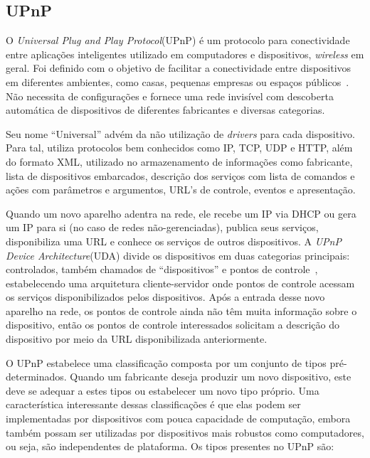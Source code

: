 \subsection{UPnP}
O \emph{Universal Plug and Play Protocol}(UPnP) é um protocolo para conectividade entre aplicações inteligentes utilizado em computadores e dispositivos, \emph{wireless} em geral. Foi definido com o objetivo de facilitar a conectividade entre dispositivos em diferentes ambientes, como casas, pequenas empresas ou espaços públicos~\cite{upnpArch}. Não necessita de configurações e fornece uma rede invisível com descoberta automática de dispositivos de diferentes fabricantes e diversas categorias.

Seu nome ``Universal'' advém da não utilização de \emph{drivers} para cada dispositivo. Para tal, utiliza protocolos bem conhecidos como IP, TCP, UDP e HTTP, além do formato XML, utilizado no armazenamento de informações como fabricante, lista de dispositivos embarcados, descrição dos serviços com lista de comandos e ações com parâmetros e argumentos, URL's de controle, eventos e apresentação.

Quando um novo aparelho adentra na rede, ele recebe um IP via DHCP ou gera um IP para si (no caso de redes não-gerenciadas), publica seus serviços, disponibiliza uma URL e conhece os serviços de outros dispositivos. A \emph{UPnP Device Architecture}(UDA) divide os dispositivos em duas categorias principais: controlados, também chamados de ``dispositivos'' e pontos de controle~\cite{upnpArch}, estabelecendo uma arquitetura cliente-servidor onde pontos de controle acessam os serviços disponibilizados pelos dispositivos. Após a entrada desse novo aparelho na rede, os pontos de controle ainda não têm muita informação sobre o dispositivo, então os pontos de controle interessados solicitam a descrição do dispositivo por meio da URL disponibilizada anteriormente.

O UPnP estabelece uma classificação composta por um conjunto de tipos pré-determinados. Quando um fabricante deseja produzir um novo dispositivo, este deve se adequar a estes tipos ou estabelecer um novo tipo próprio. Uma característica interessante dessas classificações é que elas podem ser implementadas por dispositivos com pouca capacidade de computação, embora também possam ser utilizadas por dispositivos mais robustos como computadores, ou seja, são independentes de plataforma. Os tipos presentes no UPnP são:

